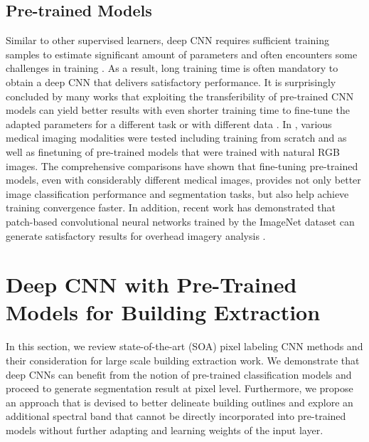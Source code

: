 \documentclass[journal]{IEEEtran}
\begin{document}
\subsection{Pre-trained Models}
Similar to other supervised learners, deep CNN requires sufficient training samples to estimate significant amount of parameters and often encounters some challenges in training  \cite{ErhanManzagolBengioEtAl2009}. As a result, long training time is often mandatory to obtain a deep CNN that delivers satisfactory performance.  It is surprisingly concluded by many works that exploiting the transferibility of pre-trained CNN models can yield better results \cite{Penatti2015} with even shorter training time to fine-tune the adapted parameters for a different task or with different data \cite{Bittner2017481}. In \cite{TajbakhshShinGuruduEtAl2016,Gerrand2017}, various medical imaging modalities were tested including training from scratch and as well as finetuning of pre-trained models that were trained with natural RGB images. The comprehensive comparisons have shown that fine-tuning pre-trained models, even with considerably different medical images, provides not only better image classification performance and segmentation tasks, but also help achieve training convergence faster. In addition, recent work has demonstrated that patch-based convolutional neural networks trained by the ImageNet dataset can generate satisfactory results for overhead imagery analysis \cite{ChengMaZhouEtAl2016}. 


\section{Deep CNN with Pre-Trained Models for Building Extraction}
In this section, we review state-of-the-art (SOA) pixel labeling CNN methods and their consideration for large scale building extraction work. We demonstrate that deep CNNs can benefit from the notion of pre-trained classification models and proceed to generate segmentation result at pixel level. Furthermore, we propose an approach that is devised to better delineate building outlines and explore an additional spectral band that cannot be directly incorporated into pre-trained models without further adapting and learning weights of the input layer. 
\end{document}
